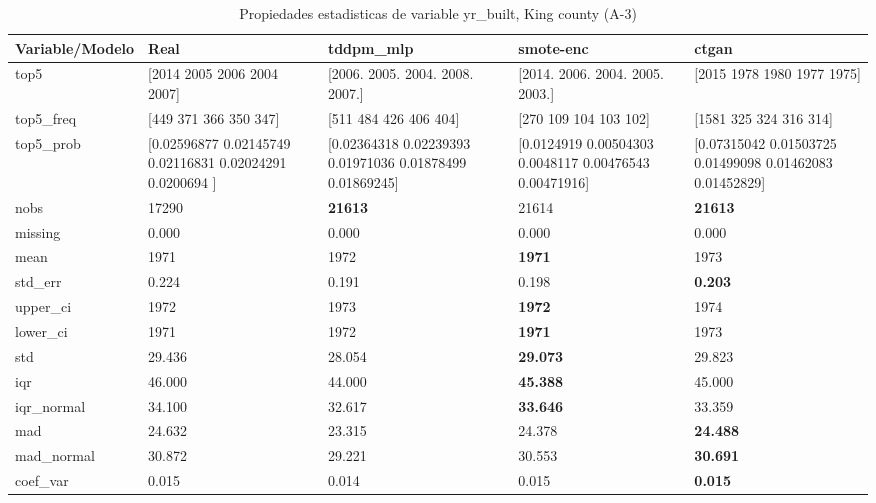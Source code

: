 \begin{table}[H]
\centering
\fontsize{8}{14}\selectfont
\caption{Propiedades  estadisticas de variable yr\_built, King county (A-3)}
\label{table-stats-king county-a-3-yr_built}
\begin{tabular}{|l|m{10em}|m{10em}|m{10em}|m{10em}|}
\hline
 \rowcolor[gray]{0.8}
Variable/Modelo & Real & tddpm\_mlp & smote-enc & ctgan \\
\hline top5 & [2014 2005 2006 2004 2007] & [2006. 2005. 2004. 2008. 2007.] & [2014. 2006. 2004. 2005. 2003.] & [2015 1978 1980 1977 1975] \\
\hline top5\_freq & [449 371 366 350 347] & [511 484 426 406 404] & [270 109 104 103 102] & [1581  325  324  316  314] \\
\hline top5\_prob & [0.02596877 0.02145749 0.02116831 0.02024291 0.0200694 ] & [0.02364318 0.02239393 0.01971036 0.01878499 0.01869245] & [0.0124919  0.00504303 0.0048117  0.00476543 0.00471916] & [0.07315042 0.01503725 0.01499098 0.01462083 0.01452829] \\
\hline nobs & 17290 & \bfseries 21613 & \cellcolor[rgb]{0.9, 0.54, 0.52} 21614 & \bfseries 21613 \\
\hline missing & 0.000 & 0.000 & 0.000 & 0.000 \\
\hline mean & 1971 & 1972 & \bfseries 1971 & \cellcolor[rgb]{0.9, 0.54, 0.52} 1973 \\
\hline std\_err & 0.224 & \cellcolor[rgb]{0.9, 0.54, 0.52} 0.191 & 0.198 & \bfseries 0.203 \\
\hline upper\_ci & 1972 & 1973 & \bfseries 1972 & \cellcolor[rgb]{0.9, 0.54, 0.52} 1974 \\
\hline lower\_ci & 1971 & 1972 & \bfseries 1971 & \cellcolor[rgb]{0.9, 0.54, 0.52} 1973 \\
\hline std & 29.436 & \cellcolor[rgb]{0.9, 0.54, 0.52} 28.054 & \bfseries 29.073 & 29.823 \\
\hline iqr & 46.000 & \cellcolor[rgb]{0.9, 0.54, 0.52} 44.000 & \bfseries 45.388 & 45.000 \\
\hline iqr\_normal & 34.100 & \cellcolor[rgb]{0.9, 0.54, 0.52} 32.617 & \bfseries 33.646 & 33.359 \\
\hline mad & 24.632 & \cellcolor[rgb]{0.9, 0.54, 0.52} 23.315 & 24.378 & \bfseries 24.488 \\
\hline mad\_normal & 30.872 & \cellcolor[rgb]{0.9, 0.54, 0.52} 29.221 & 30.553 & \bfseries 30.691 \\
\hline coef\_var & 0.015 & \cellcolor[rgb]{0.9, 0.54, 0.52} 0.014 & 0.015 & \bfseries 0.015 \\

\end{tabular}
\end{table}
